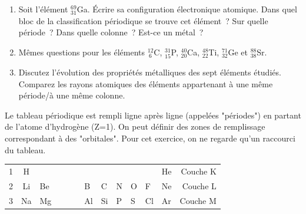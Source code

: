 %
\begin{enumerate}[\bf 1)]
\item Soit l'\'el\'ement $_{31}^{69}$Ga. \'Ecrire sa configuration \'electronique atomique.
Dans quel bloc de la classification p\'eriodique se trouve cet \'el\'ement~?
Sur quelle p\'eriode~?
Dans quelle colonne~?
Est-ce un m\'etal~?
\item M\^emes questions pour les \'el\'ements $_{~6}^{12}$C, $_{15}^{31}$P, $_{20}^{40}$Ca, 
$_{22}^{48}$Ti, $_{32}^{71}$Ge et $_{38}^{88}$Sr.
\item Discutez l'\'evolution des propri\'et\'es m\'etalliques des sept \'el\'ements \'etudi\'es. 
Comparez les rayons atomiques des \'el\'ements appartenant \`a une m\^eme p\'eriode/\`a une m\^eme colonne.
\end{enumerate}
Le tableau p\'eriodique est rempli ligne apr\`es ligne (appel\'ees "p\'eriodes") en partant
de l'atome d'hydrog\`ene (Z=1). On peut d\'efinir des zones de remplissage correspondant \`a des
"orbitales". Pour cet exercice, on ne regarde qu'un raccourci du tableau.

\begin{center}
\begin{tabular}{rcllllllllllr}
1 & H  &    & & & &    &    &    &    &    & He & Couche K \\
2 & Li & Be & & & & B  & C  & N  & O  & F  & Ne & Couche L \\
3 & Na & Mg & & & & Al & Si & P  & S  & Cl & Ar & Couche M \\
\end{tabular}
\end{center}

